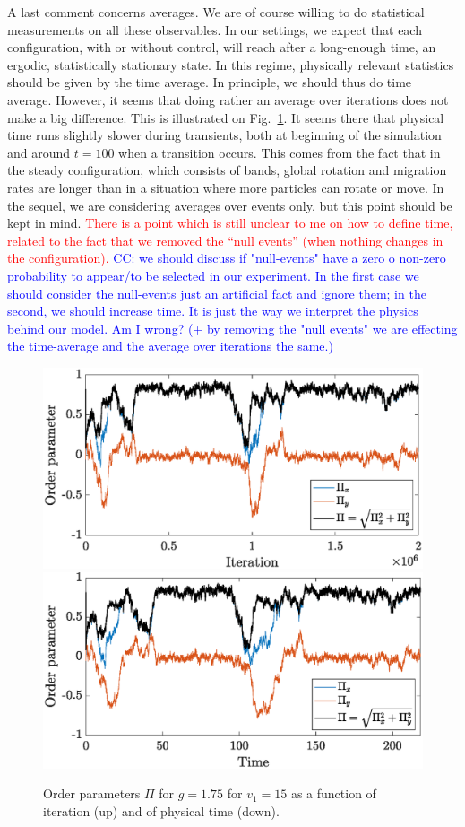 \documentclass[aps,prl,twocolumn,amsmath,amssymb,superscriptaddress]{revtex4-1}
\newcommand{\obs}[1]{\textcolor{red}{#1}}
\newcommand{\CC}[1]
{\textcolor{blue}{#1}}
\begin{document}
A last comment concerns averages. We are of course willing to do statistical measurements on all these observables. In our settings, we expect that each configuration, with or without control, will reach after a long-enough time, an ergodic, statistically  stationary state. In this regime, physically relevant statistics should be given by the time average. In principle, we should thus do time average. However, it seems that doing rather an average over iterations does not make a big difference. This is illustrated on Fig.~\ref{fig:compare_times}. It seems there that physical time runs slightly slower during transients, both at beginning of the simulation and around $t=100$ when a transition occurs. This comes from the fact that in the steady configuration, which consists of bands, global rotation and migration rates are longer than in a situation where more particles can rotate or move. In the sequel, we are considering averages over events only, but this point should be kept in mind. \obs{There is a point which is still unclear to me on how to define time, related to the fact that we removed the ``null events'' (when nothing changes in the configuration).} \CC{CC: we should discuss if "null-events" have a zero o non-zero probability to appear/to be selected in our experiment. In the first case we should consider the null-events just an artificial fact and ignore them; in the second, we  should increase time. 
It is just the way we interpret the physics behind our model. Am I wrong? (+ by removing the "null events" we are effecting the time-average and the average over iterations the same.)}
\begin{figure}[h!]
   \centering
   \includegraphics[width=.38\textwidth]{ord_param_phi_g1.75_v1_15_fn_iter}\\
   \includegraphics[width=.38\textwidth]{ord_param_phi_g1.75_v1_15_fn_time}
   \vspace{-10pt}
   \caption{\label{fig:compare_times} Order parameters $\Pi$ for $g=1.75$ for $v_1=15$ as a function of iteration (up) and of physical time (down).}
\end{figure}
\end{document}
